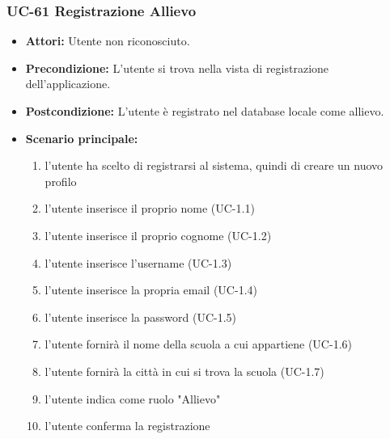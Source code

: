 \subsubsection{UC-61 Registrazione Allievo}
\begin{itemize}
	\item \textbf{Attori: }Utente non riconosciuto.
	\item \textbf{Precondizione: }L'utente si trova nella vista di registrazione dell'applicazione.
	\item \textbf{Postcondizione: }L'utente è registrato nel database locale come allievo.
	\item \textbf{Scenario principale: }
		\begin{enumerate}
		\item l'utente ha scelto di registrarsi al sistema, quindi di creare un nuovo profilo
		\item l'utente inserisce il proprio nome (UC-1.1)
		\item l'utente inserisce il proprio cognome (UC-1.2)
		\item l'utente inserisce l'username (UC-1.3)
		\item l'utente inserisce la propria email (UC-1.4)
		\item l'utente inserisce la password (UC-1.5)
		\item l'utente fornirà il nome della scuola a cui appartiene (UC-1.6)
		\item l'utente fornirà la città in cui si trova la scuola (UC-1.7)
		\item l'utente indica come ruolo "Allievo"
		\item l'utente conferma la registrazione
		\end{enumerate}
\end{itemize}


